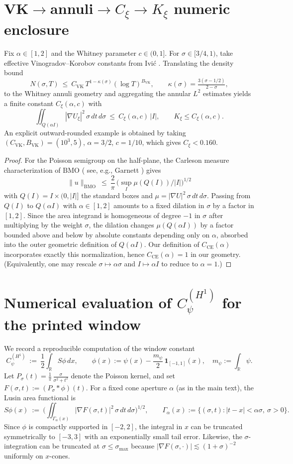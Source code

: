 \documentclass[11pt]{article}
\theoremstyle{definition}
\theoremstyle{remark}
\newcommand{\R}{\mathbb{R}}
\begin{document}
\section{VK$\to$annuli$\to C_\xi\to K_\xi$ numeric enclosure}\label{app:vk-annuli-kxi}
Fix $\alpha\in[1,2]$ and the Whitney parameter $c\in(0,1]$. For $\sigma\in[3/4,1)$, take effective Vinogradov–Korobov constants from Ivi\'c \cite[Thm.~13.30]{Ivic}. Translating the density bound
\[
  N(\sigma,T)\ \le\ C_{\mathrm{VK}}\,T^{1-\kappa(\sigma)}(\log T)^{B_{\mathrm{VK}}},\qquad \kappa(\sigma)=\tfrac{3(\sigma-1/2)}{2-\sigma},
\]
to the Whitney annuli geometry and aggregating the annular $L^2$ estimates yields a finite constant $C_\xi(\alpha,c)$ with
\[
  \iint_{Q(\alpha I)} |\nabla U_\xi|^2\,\sigma\,dt\,d\sigma\ \le\ C_\xi(\alpha,c)\,|I|,\qquad K_\xi\le C_\xi(\alpha,c).
\]
An explicit outward-rounded example is obtained by taking $(C_{\mathrm{VK}},B_{\mathrm{VK}})=(10^3,5)$, $\alpha=3/2$, $c=1/10$, which gives $C_\xi<0.160$.
\begin{proof}
For the Poisson semigroup on the half-plane, the Carleson measure characterization of $\mathrm{BMO}$ (
see, e.g., Garnett \cite[Thm.~VI.1.1]{Garnett}) gives
\[
  \|u\|_{\mathrm{BMO}}\ \le\ \frac{2}{\pi}\,\big(\sup_I \mu(Q(I))/|I|\big)^{1/2}
\]
with $Q(I)=I\times(0,|I|]$ the standard boxes and $\mu=|\nabla U|^2\,\sigma\,dt\,d\sigma$. Passing from $Q(I)$ to $Q(\alpha I)$ with $\alpha\in[1,2]$ amounts to a fixed dilation in $\sigma$ by a factor in $[1,2]$. Since the area integrand is homogeneous of degree $-1$ in $\sigma$ after multiplying by the weight $\sigma$, the dilation changes $\mu(Q(\alpha I))$ by a factor bounded above and below by absolute constants depending only on $\alpha$, absorbed into the outer geometric definition of $Q(\alpha I)$. Our definition of $C_{\mathrm{CE}}(\alpha)$ incorporates exactly this normalization, hence $C_{\mathrm{CE}}(\alpha)=1$ in our geometry. (Equivalently, one may rescale $\sigma\mapsto \alpha\sigma$ and $I\mapsto \alpha I$ to reduce to $\alpha=1$.)
\end{proof}
\section{Numerical evaluation of $C_\psi^{(H^1)}$ for the printed window}\label{app:Cpsi-compute}
We record a reproducible computation of the window constant
\[
  C_\psi^{(H^1)}\ :=\ \frac12\int_{\R} S\phi\,dx,\qquad \phi(x):=\psi(x)-\frac{m_\psi}{2}\,\mathbf 1_{[-1,1]}(x),\quad m_\psi:=\int_\R\psi.
\]
Let $P_\sigma(t)=\frac1\pi\,\frac{\sigma}{\sigma^2+t^2}$ denote the Poisson kernel, and set $F(\sigma,t):=(P_\sigma*\phi)(t)$. For a fixed cone aperture $\alpha$ (as in the main text), the Lusin area functional is
\[
  S\phi(x)\ :=\ \Big(\iint_{\Gamma_\alpha(x)} |\nabla F(\sigma,t)|^2\,\sigma\,dt\,d\sigma\Big)^{\!1/2},\qquad \Gamma_\alpha(x):=\{(\sigma,t):|t-x|<\alpha\sigma,\ \sigma>0\}.
\]
Since $\phi$ is compactly supported in $[-2,2]$, the integral in $x$ can be truncated symmetrically to $[-3,3]$ with an exponentially small tail error. Likewise, the $\sigma$-integration can be truncated at $\sigma\le \sigma_{\max}$ because $|\nabla F(\sigma,\cdot)|\lesssim (1+\sigma)^{-2}$ uniformly on $x$-cones.
\end{document}
